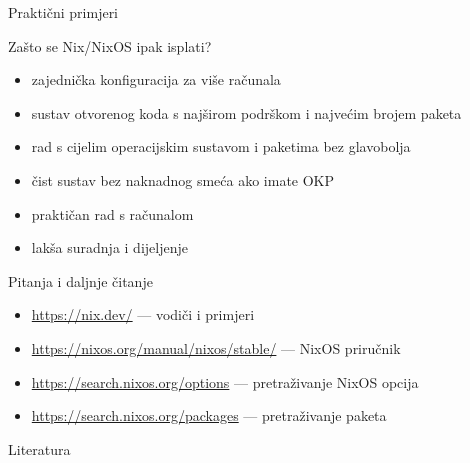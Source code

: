 \documentclass{beamer}
\begin{document}
\begin{frame}{Praktični primjeri}
\end{frame}

\begin{frame}{Zašto se Nix/NixOS ipak isplati?}
	\begin{itemize}
		\item zajednička konfiguracija za više računala
		\item sustav otvorenog koda s najširom podrškom i najvećim brojem paketa
		\item rad s cijelim operacijskim sustavom i paketima bez glavobolja
		\item čist sustav bez naknadnog smeća ako imate OKP
		\item praktičan rad s računalom
		\item lakša suradnja i dijeljenje
	\end{itemize}
\end{frame}

\begin{frame}{Pitanja i daljnje čitanje}

	\begin{itemize}
		\item {\footnotesize\url{https://nix.dev/}} --- vodiči i primjeri \cite{nixdev}
		\item {\footnotesize\url{https://nixos.org/manual/nixos/stable/}} --- NixOS priručnik \cite{nixos-manual}
		\item {\footnotesize\url{https://search.nixos.org/options}} --- pretraživanje NixOS opcija \cite{nixos-search-options}
		\item {\footnotesize\url{https://search.nixos.org/packages}} --- pretraživanje paketa \cite{nixos-search-packages}
	\end{itemize}
\end{frame}

\begin{frame}[allowframebreaks]{Literatura}
	\printbibliography[heading=none]
\end{frame}
\end{document}
